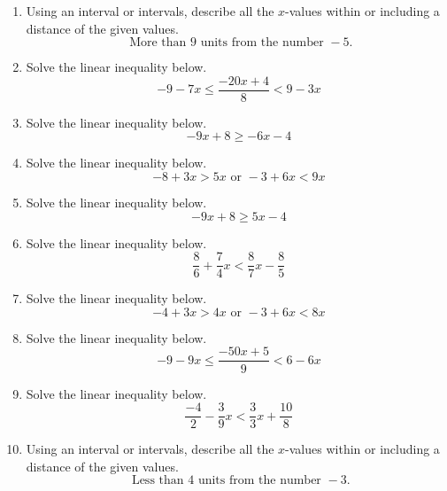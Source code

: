 \documentclass[14pt]{extbook}
\begin{document}
\begin{enumerate}
\item{
Using an interval or intervals, describe all the $x$-values within or including a distance of the given values.\[ \text{ More than } 9 \text{ units from the number } -5. \]} \newpage
\item{
Solve the linear inequality below.\[ -9 - 7 x \leq \frac{-20 x + 4}{8} < 9 - 3 x \]} \newpage
\item{
Solve the linear inequality below.\[ -9x + 8 \geq -6x -4 \]} \newpage
\item{
Solve the linear inequality below.\[ -8 + 3 x > 5 x \text{ or } -3 + 6 x < 9 x \]} \newpage
\item{
Solve the linear inequality below.\[ -9x + 8 \geq 5x -4 \]} \newpage
\item{
Solve the linear inequality below.\[ \frac{8}{6} + \frac{7}{4} x < \frac{8}{7} x - \frac{8}{5} \]} \newpage
\item{
Solve the linear inequality below.\[ -4 + 3 x > 4 x \text{ or } -3 + 6 x < 8 x \]} \newpage
\item{
Solve the linear inequality below.\[ -9 - 9 x \leq \frac{-50 x + 5}{9} < 6 - 6 x \]} \newpage
\item{
Solve the linear inequality below.\[ \frac{-4}{2} - \frac{3}{9} x < \frac{3}{3} x + \frac{10}{8} \]} \newpage
\item{
Using an interval or intervals, describe all the $x$-values within or including a distance of the given values.\[ \text{ Less than } 4 \text{ units from the number } -3. \]} \newpage
\end{enumerate}
\end{document}
